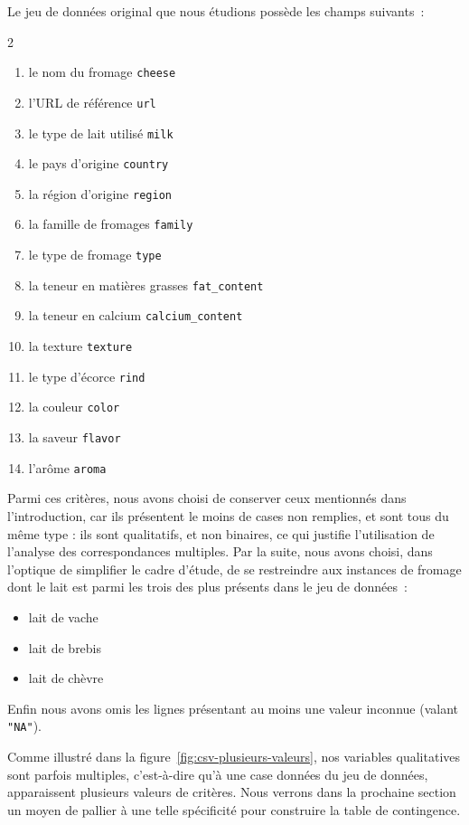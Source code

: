 \documentclass[12pt]{article}
\newcommand{\code}{\texttt}
\begin{document}
Le jeu de données original\cite{1} que nous étudions possède les champs suivants~:
\begin{multicols}{2}
\begin{enumerate}
    \item le nom du fromage \code{cheese}
    \item l’URL de référence \code{url}
    \item le type de lait utilisé \code{milk}
    \item le pays d’origine \code{country}
    \item la région d’origine \code{region}
    \item la famille de fromages \code{family}
    \item le type de fromage \code{type}
    \item la teneur en matières grasses \code{fat\_content}
    \item la teneur en calcium \code{calcium\_content}
    \item la texture \code{texture}
    \item le type d’écorce \code{rind}
    \item la couleur \code{color}
    \item la saveur \code{flavor}
    \item l’arôme \code{aroma}
\end{enumerate}
\end{multicols}

Parmi ces critères, nous avons choisi de conserver ceux mentionnés dans l'introduction, car ils présentent le moins de cases non remplies, et sont tous du même type : ils sont qualitatifs, et non binaires, ce qui justifie l'utilisation de l'analyse des correspondances multiples. Par la suite, nous avons choisi, dans l'optique de simplifier le cadre d'étude, de se restreindre aux instances de fromage dont le lait est parmi les trois des plus présents dans le jeu de données~:
\begin{itemize}
    \item lait de vache
    \item lait de brebis
    \item lait de chèvre
\end{itemize}
Enfin nous avons omis les lignes présentant au moins une valeur inconnue (valant \code{"NA"}).\\\par
Comme illustré dans la figure~\ref{fig:csv-plusieurs-valeurs}, nos variables qualitatives sont parfois multiples, c'est-à-dire qu'à une case données du jeu de données, apparaissent plusieurs valeurs de critères. Nous verrons dans la prochaine section un moyen de pallier à une telle spécificité pour construire la table de contingence.
\end{document}
